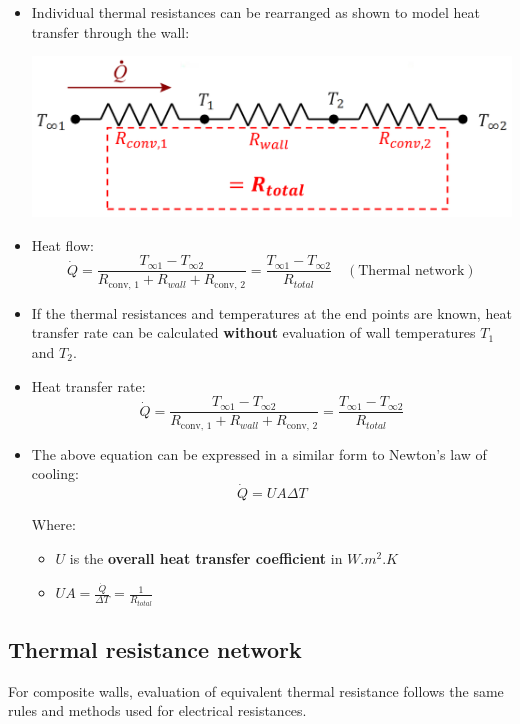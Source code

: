 \documentclass[11pt]{article}
\begin{document}
 \newpage

\begin{itemize}
\item Individual thermal resistances can be rearranged as shown to model heat transfer through the wall:
\begin{center}
\includegraphics[width=.9\linewidth]{./images/analysis-of-steady-state-heat-transfer-electrical-analogy.png}
\end{center}
\item Heat flow:
\[\dot{Q} = \frac{T_{\infty 1} - T_{\infty 2}}{R_{\text{conv, 1}} + R_{wall} + R_{\text{conv, 2}}} = \frac{T_{\infty 1} - T_{\infty 2}}{R_{total}} \quad (\text{Thermal network})\]
\item If the thermal resistances and temperatures at the end points are known, heat transfer rate can be calculated \textbf{without} evaluation of wall temperatures \(T_1\) and \(T_2\).
\item Heat transfer rate:
\[\dot{Q} = \frac{T_{\infty 1} - T_{\infty 2}}{R_{\text{conv, 1}} + R_{wall} + R_{\text{conv, 2}}} = \frac{T_{\infty 1} - T_{\infty 2}}{R_{total}}\]
\item The above equation can be expressed in a similar form to Newton's law of cooling:
\[\dot{Q} = UA \Delta T\]

Where:
\begin{itemize}
\item \(U\) is the \textbf{overall heat transfer coefficient} in \(\unit{W.m^{2}.K}\)
\item \(UA = \frac{\dot{Q}}{\Delta T} = \frac{1}{R_{total}}\)
\end{itemize}
\end{itemize}

 \newpage

\subsection{Thermal resistance network}
\label{sec:orge66cda1}
For composite walls, evaluation of equivalent thermal resistance follows the same rules and methods used for electrical resistances.
\end{document}
